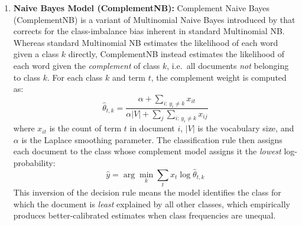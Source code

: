 \documentclass[a4paper,10pt]{article}
\begin{document}
\begin{enumerate}[label=\alph*)]
\item \textbf{Naive Bayes Model (ComplementNB):} Complement Naive Bayes (ComplementNB) is a variant of Multinomial Naive Bayes
introduced by \citet{wang2012baselines} that corrects for the class-imbalance
bias inherent in standard Multinomial NB. Whereas standard Multinomial NB
estimates the likelihood of each word given a class $k$ directly, ComplementNB
instead estimates the likelihood of each word given the \emph{complement} of
class $k$, i.e.\ all documents \emph{not} belonging to class $k$. For each
class $k$ and term $t$, the complement weight is computed as:
\[
\hat{\theta}_{t,k} = \frac{\alpha + \sum_{i:\, y_i \neq k} x_{it}}
                          {\alpha \lvert V \rvert + \sum_{j} \sum_{i:\, y_i \neq k} x_{ij}}
\]
where $x_{it}$ is the count of term $t$ in document $i$, $\lvert V \rvert$ is
the vocabulary size, and $\alpha$ is the Laplace smoothing parameter. The
classification rule then assigns each document to the class whose complement
model assigns it the \emph{lowest} log-probability:
\[
\hat{y} = \arg\min_{k} \sum_{t} x_{t} \log \hat{\theta}_{t,k}
\]
This inversion of the decision rule means the model identifies the class for
which the document is \emph{least} explained by all other classes, which
empirically produces better-calibrated estimates when class frequencies are
unequal.



\end{enumerate}
\end{document}
